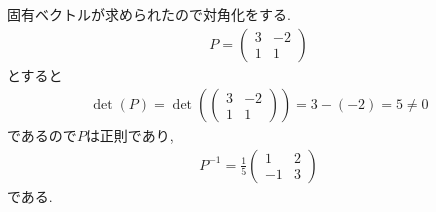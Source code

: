 固有ベクトルが求められたので対角化をする.
\begin{align*}
  P=
  \begin{pmatrix}
    3&-2\\
    1&1    
  \end{pmatrix}
\end{align*}
とすると
\begin{align*}
  \det(P)=
  \det(
  \begin{pmatrix}
    3&-2\\
    1&1    
  \end{pmatrix})
  =3-(-2)=5\neq 0
\end{align*}
であるので$P$は正則であり,
\begin{align*}
  P^{-1}=
  \frac{1}{5}
  \begin{pmatrix}
    1&2\\
    -1&3    
  \end{pmatrix}
\end{align*}
である.

